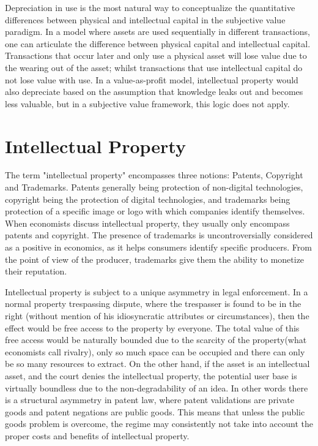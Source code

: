 \documentclass[12pt]{report}
\numberwithin{equation}{section}
\begin{document}
Depreciation in use is the most natural way to conceptualize the quantitative differences between physical and intellectual capital in the subjective value paradigm. In a model where assets are used sequentially in different transactions, one can articulate the difference between physical capital and intellectual capital. Transactions that occur later and only use a physical asset will lose value due to the wearing out of the asset; whilst transactions that use intellectual capital do not lose value with use. In a value-as-profit model, intellectual property would also depreciate based on the assumption that knowledge leaks out and becomes less valuable, but in a subjective value framework, this logic does not apply.

\section{Intellectual Property}\label{intellectual}

The term "intellectual property" encompasses three notions: Patents, Copyright and Trademarks. Patents generally being protection of non-digital technologies, copyright being the protection of digital technologies, and trademarks being protection of a specific image or logo with which companies identify themselves. When economists discuss intellectual property, they usually only encompass patents and copyright. The presence of trademarks is uncontroversially considered as a positive in economics, as it helps consumers identify specific producers. From the point of view of the producer, trademarks give them the ability to monetize their reputation. 


Intellectual property is subject to a unique asymmetry in legal enforcement. In a normal property trespassing dispute, where the trespasser is found to be in the right (without mention of his idiosyncratic attributes or circumstances), then the effect would be free access to the property by everyone. The total value of this free access would be naturally bounded due to the scarcity of the property(what economists call rivalry), only so much space can be occupied and there can only be so many resources to extract. On the other hand, if the asset is an intellectual asset, and the court denies the intellectual property, the potential user base is virtually boundless due to the non-degradability of an idea. In other words there is a structural asymmetry in patent law, where patent validations are private goods and patent negations are public goods. This means that unless the public goods problem is overcome, the regime may consistently not take into account the proper costs and benefits of intellectual property.
\end{document}
